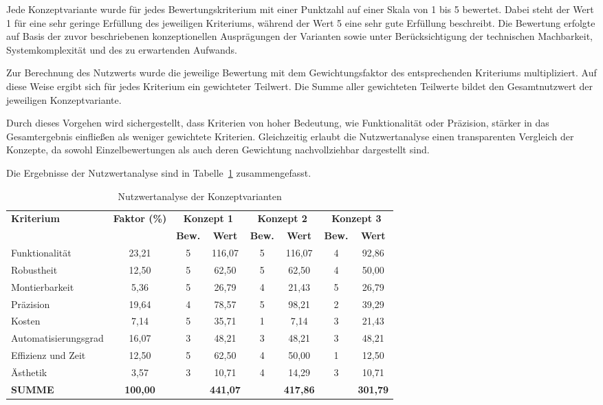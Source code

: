 Jede Konzeptvariante wurde für jedes Bewertungskriterium mit einer Punktzahl auf einer Skala von 1 bis 5 bewertet. Dabei steht der Wert 1 für eine sehr geringe Erfüllung des jeweiligen Kriteriums, während der Wert 5 eine sehr gute Erfüllung beschreibt. Die Bewertung erfolgte auf Basis der zuvor beschriebenen konzeptionellen Ausprägungen der Varianten sowie unter Berücksichtigung der technischen Machbarkeit, Systemkomplexität und des zu erwartenden Aufwands.

Zur Berechnung des Nutzwerts wurde die jeweilige Bewertung mit dem Gewichtungsfaktor des entsprechenden Kriteriums multipliziert. Auf diese Weise ergibt sich für jedes Kriterium ein gewichteter Teilwert. Die Summe aller gewichteten Teilwerte bildet den Gesamtnutzwert der jeweiligen Konzeptvariante.

Durch dieses Vorgehen wird sichergestellt, dass Kriterien von hoher Bedeutung, wie Funktionalität oder Präzision, stärker in das Gesamtergebnis einfließen als weniger gewichtete Kriterien. Gleichzeitig erlaubt die Nutzwertanalyse einen transparenten Vergleich der Konzepte, da sowohl Einzelbewertungen als auch deren Gewichtung nachvollziehbar dargestellt sind.

Die Ergebnisse der Nutzwertanalyse sind in Tabelle~\ref{tab:nutzwertanalyse} zusammengefasst.

{
\begin{table}[H]
\centering
\small
\setlength{\tabcolsep}{4pt}
\renewcommand{\arraystretch}{1.2}

\begin{tabular}{|l|c|c|c|c|c|c|c|}
\hline
\multirow{2}{*}{\textbf{Kriterium}} &
\multirow{2}{*}{\textbf{Faktor (\%)}} &
\multicolumn{2}{c|}{\textbf{Konzept 1}} &
\multicolumn{2}{c|}{\textbf{Konzept 2}} &
\multicolumn{2}{c|}{\textbf{Konzept 3}} \\
\cline{3-8}
 &  & \textbf{Bew.} & \textbf{Wert} & \textbf{Bew.} & \textbf{Wert} & \textbf{Bew.} & \textbf{Wert} \\
\hline
Funktionalität       & 23,21 & 5 & 116,07 & 5 & 116,07 & 4 & 92,86 \\
\hline
Robustheit           & 12,50 & 5 & 62,50  & 5 & 62,50  & 4 & 50,00 \\
\hline
Montierbarkeit       & 5,36  & 5 & 26,79  & 4 & 21,43  & 5 & 26,79 \\
\hline
Präzision            & 19,64 & 4 & 78,57  & 5 & 98,21  & 2 & 39,29 \\
\hline
Kosten               & 7,14  & 5 & 35,71  & 1 & 7,14   & 3 & 21,43 \\
\hline
Automatisierungsgrad & 16,07 & 3 & 48,21  & 3 & 48,21  & 3 & 48,21 \\
\hline
Effizienz und Zeit   & 12,50 & 5 & 62,50  & 4 & 50,00  & 1 & 12,50 \\
\hline
Ästhetik             & 3,57  & 3 & 10,71  & 4 & 14,29  & 3 & 10,71 \\
\hline
\textbf{SUMME} & \textbf{100,00} &  & \textbf{441,07} &  & \textbf{417,86} &  & \textbf{301,79} \\
\hline
\end{tabular}

\caption{Nutzwertanalyse der Konzeptvarianten}
\label{tab:nutzwertanalyse}
\end{table}
}

